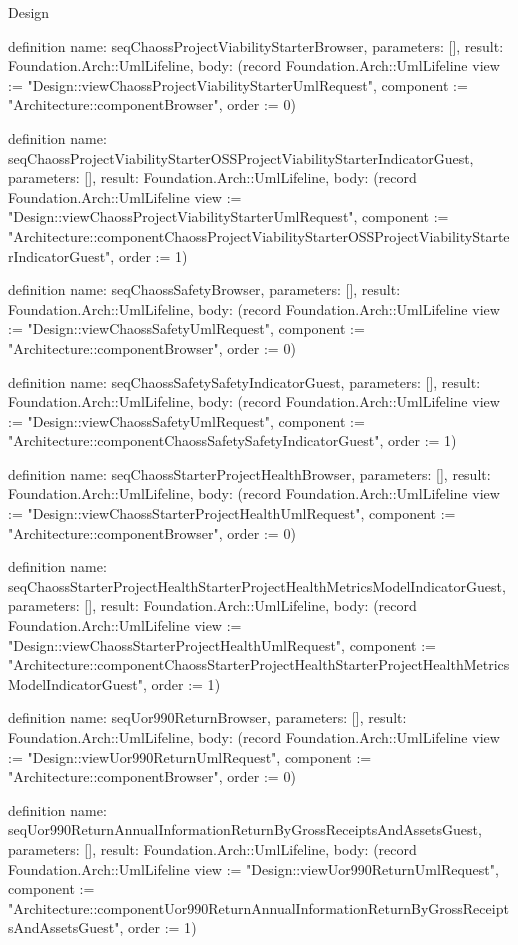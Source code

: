 \begin{lexlean}{Design}
\begin{semanticmodule}
definition{
  name: seqChaossProjectViabilityStarterBrowser,
  parameters: [],
  result: Foundation.Arch::UmlLifeline,
  body: (record Foundation.Arch::UmlLifeline {view := "Design::viewChaossProjectViabilityStarterUmlRequest", component := "Architecture::componentBrowser", order := 0})
}

definition{
  name: seqChaossProjectViabilityStarterOSSProjectViabilityStarterIndicatorGuest,
  parameters: [],
  result: Foundation.Arch::UmlLifeline,
  body: (record Foundation.Arch::UmlLifeline {view := "Design::viewChaossProjectViabilityStarterUmlRequest", component := "Architecture::componentChaossProjectViabilityStarterOSSProjectViabilityStarterIndicatorGuest", order := 1})
}

definition{
  name: seqChaossSafetyBrowser,
  parameters: [],
  result: Foundation.Arch::UmlLifeline,
  body: (record Foundation.Arch::UmlLifeline {view := "Design::viewChaossSafetyUmlRequest", component := "Architecture::componentBrowser", order := 0})
}

definition{
  name: seqChaossSafetySafetyIndicatorGuest,
  parameters: [],
  result: Foundation.Arch::UmlLifeline,
  body: (record Foundation.Arch::UmlLifeline {view := "Design::viewChaossSafetyUmlRequest", component := "Architecture::componentChaossSafetySafetyIndicatorGuest", order := 1})
}

definition{
  name: seqChaossStarterProjectHealthBrowser,
  parameters: [],
  result: Foundation.Arch::UmlLifeline,
  body: (record Foundation.Arch::UmlLifeline {view := "Design::viewChaossStarterProjectHealthUmlRequest", component := "Architecture::componentBrowser", order := 0})
}

definition{
  name: seqChaossStarterProjectHealthStarterProjectHealthMetricsModelIndicatorGuest,
  parameters: [],
  result: Foundation.Arch::UmlLifeline,
  body: (record Foundation.Arch::UmlLifeline {view := "Design::viewChaossStarterProjectHealthUmlRequest", component := "Architecture::componentChaossStarterProjectHealthStarterProjectHealthMetricsModelIndicatorGuest", order := 1})
}

definition{
  name: seqUor990ReturnBrowser,
  parameters: [],
  result: Foundation.Arch::UmlLifeline,
  body: (record Foundation.Arch::UmlLifeline {view := "Design::viewUor990ReturnUmlRequest", component := "Architecture::componentBrowser", order := 0})
}

definition{
  name: seqUor990ReturnAnnualInformationReturnByGrossReceiptsAndAssetsGuest,
  parameters: [],
  result: Foundation.Arch::UmlLifeline,
  body: (record Foundation.Arch::UmlLifeline {view := "Design::viewUor990ReturnUmlRequest", component := "Architecture::componentUor990ReturnAnnualInformationReturnByGrossReceiptsAndAssetsGuest", order := 1})
}


\end{semanticmodule}
\end{lexlean}
